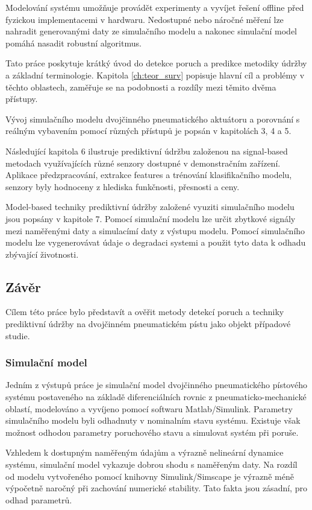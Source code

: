 Modelování systému umožňuje provádět experimenty a vyvíjet řešení
offline před fyzickou implementacemi v hardwaru. Nedostupné nebo
náročné  měření lze nahradit generovanými daty
ze simulačního modelu a nakonec simulační model pomáhá nasadit robustní
algoritmus.

Tato práce poskytuje krátký úvod do detekce poruch a predikce
metodiky údržby a základní terminologie.
Kapitola \ref{ch:teor_surv} popisuje hlavní cíl a problémy
v těchto oblastech, zaměřuje se na podobnosti a rozdíly mezi těmito 
dvěma přístupy.

Vývoj simulačního modelu dvojčinného pneumatického aktuátoru a
porovnání s reálným vybavením pomocí různých přístupů je
popsán v kapitolách 3, 4 a 5.

Následující kapitola 6 ilustruje prediktivní údržbu založenou na
signal-based
metodach využívajících různé senzory dostupné v demonstračním zařízení.
Aplikace předzpracování, extrakce features a trénování klasifikačního
modelu,
senzory byly hodnoceny z hlediska funkčnosti, přesnosti a ceny.

Model-based techniky prediktivní údržby založené vyuziti simulačního modelu
jsou popsány v kapitole 7. Pomocí simulační modelu lze
určit zbytkové signály mezi naměřenými daty a simulacímí daty z 
výstupu modelu. Pomocí simulačního modelu lze vygenerovávat údaje o degradaci
systemi a použit tyto data k odhadu zbývající životnosti.

\subsection*{Závěr}
Cílem této práce bylo představít a ověřit metody detekcí poruch a
techniky prediktivní údržby na dvojčinném pneumatickém pístu
jako objekt případové studie.

\subsubsection*{Simulační model}

Jedním z výstupů práce je simulační model
dvojčinného pneumatického pístového systému postaveného na základě diferenciálních rovnic
z pneumaticko-mechanické oblastí, modelováno a vyvíjeno pomocí
softwaru Matlab/Simulink. Parametry simulačního modelu byli odhadnuty v
nominalním stavu systému. Existuje však možnost
odhodou parametry poruchového stavu a simulovat systém při poruše.

Vzhledem k dostupným naměřeným údajům a výrazně nelineární dynamice
systému, simulační model vykazuje dobrou shodu s naměřeným
daty. Na rozdíl od modelu vytvořeného pomocí knihovny Simulink/Simscape je
výrazně méně výpočetně naročný při zachování numerické
stability. Tato fakta jsou zásadní, pro odhad parametrů.

